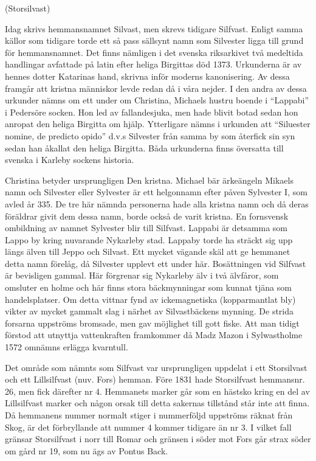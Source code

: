 
  (Storsilvast)

Idag skrivs hemmansnamnet Silvast, men skrevs tidigare Silfvast. Enligt samma källor som tidigare torde ett så pass sällsynt namn som Silvester ligga till grund för hemmansnamnet. Det finns nämligen i det svenska riksarkivet två medeltida handlingar avfattade på latin efter heliga Birgittas död 1373. Urkunderna är av hennes dotter Katarinas hand, skrivna inför moderns kanonisering. Av dessa framgår att kristna människor levde redan då i våra nejder. I den andra av dessa urkunder nämns om ett under om Christina, Michaels hustru boende i ``Lappabi'' i Pedersöre socken. Hon led av fallandesjuka, men hade blivit botad sedan hon anropat den heliga Birgitta om hjälp. Ytterligare nämns i urkunden att ``Siluester nomine, de predicto opido'' d.v.s Silvester från samma by som återfick sin syn sedan han åkallat den heliga Birgitta. Båda urkunderna finns översatta till svenska i Karleby sockens historia.

Christina betyder ursprungligen Den kristna. Michael bär ärkeängeln Mikaels namn och Silvester eller Sylvester är ett helgonnamn efter påven Sylvester I, som avled år 335. De tre här nämnda personerna hade alla kristna namn och då deras föräldrar givit dem dessa namn, borde också de varit kristna. En fornsvensk ombildning av namnet Sylvester blir till Silfvast. Lappabi är detsamma som Lappo by kring nuvarande Nykarleby stad. Lappaby torde ha sträckt sig upp längs älven till Jeppo och Silvast. Ett mycket vägande skäl att ge  hemmanet detta namn förelåg, då Silvester upplevt ett under här. Bosättningen vid Silfvast är bevisligen gammal. Här förgrenar sig Nykarleby älv i två älvfåror, som omsluter en holme och här finns stora bäckmynningar som kunnat tjäna som handelsplatser. Om detta vittnar fynd av ickemagnetiska (kopparmantlat bly) vikter av mycket gammalt slag i närhet av Silvastbäckens mynning. De strida forsarna uppströms bromsade, men gav möjlighet till gott fiske. Att man tidigt förstod att utnyttja vattenkraften framkommer då Madz Mazon i Sylwastholme 1572 omnämns erlägga kvarntull.

Det område som nämnts som Silfvast var ursprungligen uppdelat i ett Storsilvast och ett Lillsilfvast (nuv. Fors) hemman. Före 1831 hade Storsilfvast hemmansnr. 26, men fick därefter nr 4. Hemmanets marker går som en hästsko kring en del av Lillsilfvast marker och någon orsak till detta sakernas tillstånd står inte att finna. Då hemmanens nummer normalt stiger i nummerföljd uppströms räknat från Skog, är det förbryllande att nummer 4 kommer tidigare än nr 3. I vilket fall gränsar Storsilfvast i norr till Romar och gränsen i söder mot Fors går strax söder om gård nr 19, som nu ägs av Pontus Back.

